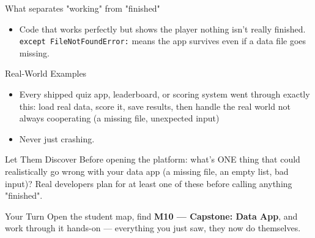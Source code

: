 \documentclass[aspectratio=169]{beamer}
\begin{document}
\begin{frame}{What separates "working" from "finished"}
    \large
    \begin{itemize}
        \item Code that works perfectly but shows the player nothing isn't really finished. \texttt{except FileNotFoundError:} means the app survives even if a data file goes missing.
    \end{itemize}
\end{frame}

\begin{frame}{Real-World Examples}
    \large
    \begin{itemize}
        \item Every shipped quiz app, leaderboard, or scoring system went through exactly this: load real data, score it, save results, then handle the real world not always cooperating (a missing file, unexpected input)
        \item Never just crashing.
    \end{itemize}
\end{frame}


\begin{frame}{Let Them Discover}
    \Large
    Before opening the platform: what's ONE thing that could realistically go wrong with your data app (a missing file, an empty list, bad input)? Real developers plan for at least one of these before calling anything "finished".
\end{frame}

\begin{frame}{Your Turn}
    \Large
    Open the student map, find \textbf{M10 — Capstone: Data App}, and work through it
    hands-on --- everything you just saw, they now do themselves.
\end{frame}
\end{document}
